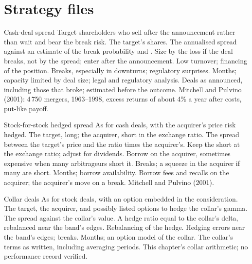 \section{Strategy files}

\begin{strategyfile}{Cash-deal spread}\label{strat:s1:merger-arbitrage:cash}
 Target shareholders who sell after the announcement rather than wait and bear the break risk.
 The target's shares.
 The annualised spread against an estimate of the break probability and .
 Size by the loss if the deal breaks, not by the spread; enter after the announcement.
 Low turnover; financing of the position.
 Breaks, especially in downturns; regulatory surprises.
 Months; capacity limited by deal size; legal and regulatory analysis.
 Deals as announced, including those that broke;  estimated before the outcome.
 Mitchell and Pulvino (2001): 4\,750 mergers, 1963--1998, excess returns of about 4\% a year after costs, put-like payoff.
\end{strategyfile}

\begin{strategyfile}{Stock-for-stock hedged spread}\label{strat:s1:merger-arbitrage:stock}
 As for cash deals, with the acquirer's price risk hedged.
 The target, long; the acquirer, short in the exchange ratio.
 The spread between the target's price and the ratio times the acquirer's.
 Keep the short at the exchange ratio; adjust for dividends.
 Borrow on the acquirer, sometimes expensive when many arbitrageurs short it.
 Breaks; a squeeze in the acquirer if many are short.
 Months; borrow availability.
 Borrow fees and recalls on the acquirer; the acquirer's move on a break.
 Mitchell and Pulvino (2001).
\end{strategyfile}

\begin{strategyfile}{Collar deals}\label{strat:s1:merger-arbitrage:collar}
 As for stock deals, with an option embedded in the consideration.
 The target, the acquirer, and possibly listed options to hedge the collar's gamma.
 The spread against the collar's value.
 A hedge ratio equal to the collar's delta, rebalanced near the band's edges.
 Rebalancing of the hedge.
 Hedging errors near the band's edges; breaks.
 Months; an option model of the collar.
 The collar's terms as written, including averaging periods.
 This chapter's collar arithmetic; no performance record verified.
\end{strategyfile}

